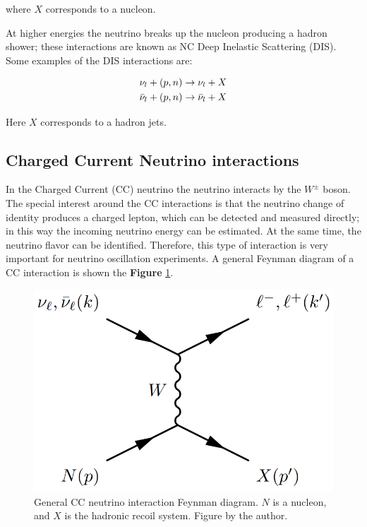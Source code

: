 where $X$ corresponds to a nucleon. 

At higher energies the neutrino breaks up the nucleon producing a hadron shower; these interactions are known as NC Deep Inelastic Scattering (DIS). Some examples of the DIS interactions are: 

\begin{equation}
    \begin{split}
        \nu_l + (p,n) \rightarrow \nu_l + X \\
        \Bar{\nu}_l + (p,n) \rightarrow \Bar{\nu}_l + X \\
    \end{split}
\end{equation}

Here $X$ corresponds to a hadron jets. 

\subsection{Charged Current Neutrino interactions}
\label{Cap:Int:NuInteractions:CC}

In the Charged Current (CC) neutrino the neutrino interacts by the $W^\pm$ boson. The special interest around the CC interactions is that the neutrino change of identity produces a charged lepton, which can be detected and measured directly; in this way the incoming neutrino energy can be estimated. At the same time, the neutrino flavor can be identified. Therefore, this type of interaction is very important for neutrino oscillation experiments. A general Feynman diagram of a CC interaction is shown the \textbf{Figure} \ref{fig:Int:NuInteractions:CCFeynman}. 

\begin{figure}[!htb]
    \centering
    \includegraphics[scale=0.3]{Figures/Chapter1/CCFeynmanDiag.png}
    \caption{General CC neutrino interaction Feynman diagram. $N$ is a nucleon, and $X$ is the hadronic recoil system. Figure by the author.}
    \label{fig:Int:NuInteractions:CCFeynman}
\end{figure}

